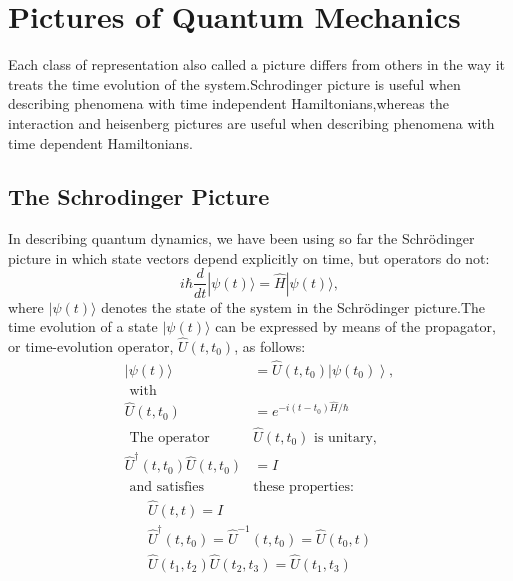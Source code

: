 \section{Pictures of Quantum Mechanics}
Each class of representation also called a picture differs from others in the way it treats the time evolution of the system.Schrodinger picture is useful when describing phenomena with time independent Hamiltonians,whereas the interaction and heisenberg pictures are useful when describing phenomena with time dependent Hamiltonians.
\subsection{The Schrodinger Picture}
In describing quantum dynamics, we have been using so far the Schrödinger picture in which state vectors depend explicitly on time, but operators do not:
$$
i \hbar \frac{d}{d t}|\psi(t)\rangle=\hat{H}|\psi(t)\rangle,
$$
where $|\psi(t)\rangle$ denotes the state of the system in the Schrödinger picture.The  time evolution of a state $|\psi(t)\rangle$ can be expressed by means of the propagator, or time-evolution operator, $\hat{U}\left(t, t_{0}\right)$, as follows:
	$$
	\begin{aligned}
	|\psi(t)\rangle&=\hat{U}\left(t, t_{0}\right)\left|\psi\left(t_{0}\right)\right\rangle,\\
\text{	with}\hspace{1cm}\\
	\hat{U}\left(t, t_{0}\right)&=e^{-i\left(t-t_{0}\right) \hat{H} / \hbar}\\
\text{	The operator }&\hat{U}\left(t, t_{0}\right)\text{ is unitary,}\\
	\hat{U}^{\dagger}\left(t, t_{0}\right) \hat{U}\left(t, t_{0}\right)&=I\\
\text{	and satisfies }&\text{these properties:}
\end{aligned}
$$
$$
\begin{gathered}
\hat{U}(t, t)=I \\
\hat{U}^{\dagger}\left(t, t_{0}\right)=\hat{U}^{-1}\left(t, t_{0}\right)=\hat{U}\left(t_{0}, t\right) \\
\hat{U}\left(t_{1}, t_{2}\right) \hat{U}\left(t_{2}, t_{3}\right)=\hat{U}\left(t_{1}, t_{3}\right)
\end{gathered}
$$
